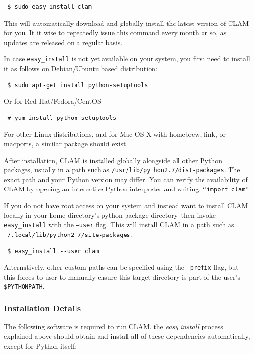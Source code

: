 \documentclass[a4paper,12pt]{report}
\begin{document}
\begin{verbatim} $ sudo easy_install clam \end{verbatim}

This will automatically download and globally install the latest version of
CLAM for you. It it wise to repeatedly issue this command every month or so, as
updates are released on a regular basis.

In case \texttt{easy\_install} is not yet available on your system, you first need to
install it as follows on Debian/Ubuntu based distribution: 

\begin{verbatim} $ sudo apt-get install python-setuptools \end{verbatim}

Or for Red Hat/Fedora/CentOS:

\begin{verbatim} # yum install python-setuptools \end{verbatim}

For other Linux distributions, and for Mac OS X with homebrew, fink, or
macports, a similar package should exist. 

After installation, CLAM is installed globally alongside all other Python
packages, usually in a path such as \texttt{/usr/lib/python2.7/dist-packages}.
The exact path and your Python version may differ. You can verify the
availability of CLAM by opening an interactive Python interpreter and writing:
`'\texttt{import clam}''

If you do not have root access on your system and instead want to install CLAM
locally in your home directory's python package directory, then invoke
\texttt{easy\_install} with the \texttt{--user} flag. This will install CLAM in
a path such as \texttt{~/.local/lib/python2.7/site-packages}.

\begin{verbatim} $ easy_install --user clam \end{verbatim}

Alternatively, other custom paths can be specified using the \texttt{--prefix}
flag, but this forces to user to manually ensure this target directory is part
of the user's \texttt{\$PYTHONPATH}.

\subsubsection{Installation Details} 
 
The following software is required to run CLAM, the \emph{easy install} process
explained above should obtain and install all of these dependencies
automatically, except for Python itself:
\end{document}
